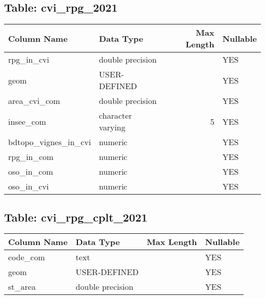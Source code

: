 \subsection*{Table: cvi_rpg_2021}
\begin{tabular}{llrl}
\hline
 Column Name          & Data Type         &   Max Length & Nullable   \\
\hline
 rpg_in_cvi           & double precision  &              & YES        \\
 geom                 & USER-DEFINED      &              & YES        \\
 area_cvi_com         & double precision  &              & YES        \\
 insee_com            & character varying &            5 & YES        \\
 bdtopo_vignes_in_cvi & numeric           &              & YES        \\
 rpg_in_com           & numeric           &              & YES        \\
 oso_in_com           & numeric           &              & YES        \\
 oso_in_cvi           & numeric           &              & YES        \\
\hline
\end{tabular}
\subsection*{Table: cvi_rpg_cplt_2021}
\begin{tabular}{llll}
\hline
 Column Name   & Data Type        & Max Length   & Nullable   \\
\hline
 code_com      & text             &              & YES        \\
 geom          & USER-DEFINED     &              & YES        \\
 st_area       & double precision &              & YES        \\
\hline
\end{tabular}
